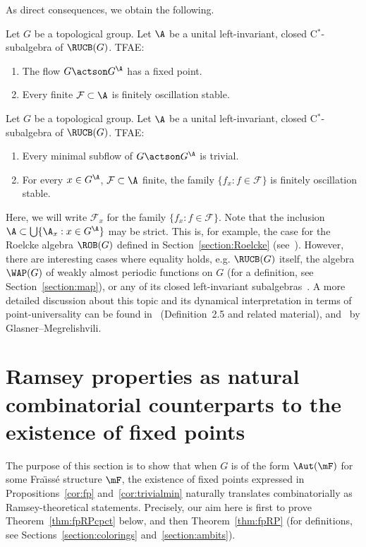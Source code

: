 As direct consequences, we obtain the following.

\begin{prop}\label{cor:fp}
Let $G$ be a topological group. Let $\A$ be a unital left-invariant, closed C$^{*}$-subalgebra of $\RUCB(G)$. TFAE:
\begin{enumerate}
\item The flow $G\actson G^{\A}$ has a fixed point.
\item Every finite $\mathcal F\subset \A$ is finitely oscillation stable.
\end{enumerate}
\end{prop}

\begin{prop}\label{cor:trivialmin}
Let $G$ be a topological group. Let $\A$ be a unital left-invariant, closed C$^{*}$-subalgebra of $\RUCB(G)$. TFAE:
\begin{enumerate}
\item Every minimal subflow of $G\actson G^{\A}$ is trivial.
\item For every $x\in G^{\A}$, $\mathcal F\subset \A$ finite, the family $\{ f_{x}:f\in \mathcal F\}$ is finitely oscillation stable.
\end{enumerate}
\end{prop}

Here, we will write $\mathcal F_{x}$ for the family $\{ f_{x}:f\in \mathcal F\}$. Note that the inclusion $\A\subset \bigcup\{\A_{x}:x\in G^{\A}\}$ may be strict. This is, for example, the case for the Roelcke algebra $\ROB(G)$ defined in Section~\ref{section:Roelcke} (see~\cite[Corollary~4.11]{GlM2}). However, there are interesting cases where equality holds, e.g. $\RUCB(G)$ itself, the algebra $\WAP(G)$ of weakly almost periodic functions on $G$ (for a definition, see Section~\ref{section:map}), or any of its closed left-invariant subalgebras~\cite[Chapter~III, Lemma~8.8]{BJM}. A more detailed discussion about this topic and its dynamical interpretation in terms of point-universality can be found in~\cite{GlM1} (Definition~2.5 and related material), \cite[Sections~3 and 4]{GlM2} and~\cite[Remarks 4.15 and 4.16]{GlM3} by Glasner--Megrelishvili.


\section{Ramsey properties as natural combinatorial counterparts to the existence of fixed points}
\label{section:RPfp}

The purpose of this section is to show that when $G$ is of the form $\Aut(\mF)$ for some Fra\"{\i}ss\'e structure $\mF$, the existence of fixed points expressed in Propositions~\ref{cor:fp} and~\ref{cor:trivialmin} naturally translates combinatorially as Ramsey-theoretical statements. Precisely, our aim here is first to prove Theorem~\ref{thm:fpRPcpct} below, and then Theorem~\ref{thm:fpRP} (for definitions, see Sections~\ref{section:colorings} and~\ref{section:ambits}).

